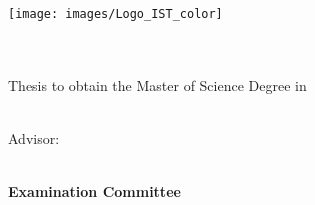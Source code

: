 
\begin{titlepage}
\texttt{[image: images/Logo\_IST\_color]}~\\[2.0cm]
\begin{center}
{\LARGE \textbf{\Title}}\\[1.0cm]
{\Large \textbf{\StudentName}}\\[1.0cm]
{\large Thesis to obtain the Master of Science Degree in}\\[1.0cm]
{\LARGE \textbf{\DegreeName}}\\[1.0cm]

\begin{minipage}[t]{.75\textwidth}
\begin{center}
{\large Advisor:\:}
{\Supervisors}
\end{center}
\end{minipage}\\[1.0cm]



{\Large \textbf{Examination Committee}}\\[.25cm]


\end{center}
\end{titlepage}
